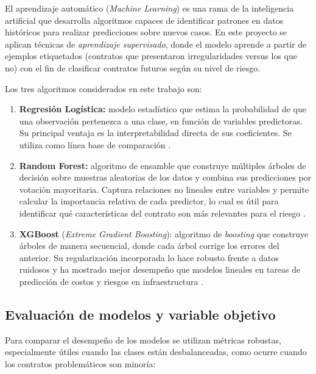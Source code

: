 El aprendizaje automático (\textit{Machine Learning}) es una rama de la inteligencia artificial que desarrolla algoritmos capaces de identificar patrones en datos históricos para realizar predicciones sobre nuevos casos. En este proyecto se aplican técnicas de \textit{aprendizaje supervisado}, donde el modelo aprende a partir de ejemplos etiquetados (contratos que presentaron irregularidades versus los que no) con el fin de clasificar contratos futuros según su nivel de riesgo.

Los tres algoritmos considerados en este trabajo son:

\begin{enumerate}
    \item \textbf{Regresión Logística:} modelo estadístico que estima la probabilidad de que una observación pertenezca a una clase, en función de variables predictoras. Su principal ventaja es la interpretabilidad directa de sus coeficientes. Se utiliza como línea base de comparación \cite{gallego2021preventing}.

    \item \textbf{Random Forest:} algoritmo de ensamble que construye múltiples árboles de decisión sobre muestras aleatorias de los datos y combina sus predicciones por votación mayoritaria. Captura relaciones no lineales entre variables y permite calcular la importancia relativa de cada predictor, lo cual es útil para identificar qué características del contrato son más relevantes para el riesgo \cite{salazar2024vigia, decarolis2022corruption}.

    \item \textbf{XGBoost} (\textit{Extreme Gradient Boosting}): algoritmo de \textit{boosting} que construye árboles de manera secuencial, donde cada árbol corrige los errores del anterior. Su regularización incorporada lo hace robusto frente a datos ruidosos y ha mostrado mejor desempeño que modelos lineales en tareas de predicción de costos y riesgos en infraestructura \cite{alshboul2022extreme}.
\end{enumerate}

\subsection{Evaluación de modelos y variable objetivo}

Para comparar el desempeño de los modelos se utilizan métricas robustas, especialmente útiles cuando las clases están desbalanceadas, como ocurre cuando los contratos problemáticos son minoría:

